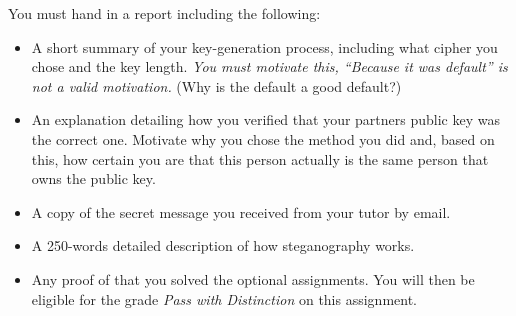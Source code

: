 \documentclass[a4paper]{llncs}
\begin{document}
You must hand in a report including the following:
\begin{itemize}
  \item A short summary of your key-generation process, including what cipher 
    you chose and the key length.
    \emph{You must motivate this, ``Because it was default'' is not a valid 
    motivation.}
    (Why is the default a good default?)
  \item An explanation detailing how you verified that your partners public key 
    was the correct one.
    Motivate why you chose the method you did and, based on this, how certain 
    you are that this person actually is the same person that owns the public 
    key.
  \item A copy of the secret message you received from your tutor by email.
  \item A 250-words detailed description of how steganography works.
  \item Any proof of that you solved the optional assignments.
    You will then be eligible for the grade \emph{Pass with Distinction} on this 
    assignment.

\end{itemize}


\printbibliography{}
\end{document}
